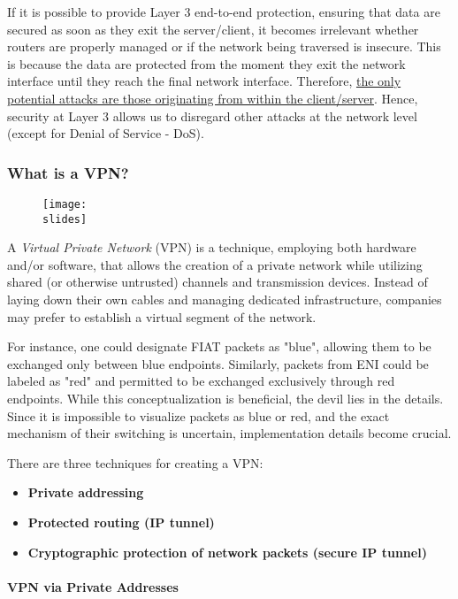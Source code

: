 If it is possible to provide Layer 3 end-to-end protection, ensuring that data are secured as soon as they exit the server/client, it becomes irrelevant whether routers are properly managed or if the network being traversed is insecure. This is because the data are protected from the moment they exit the network interface until they reach the final network interface. Therefore, \ul{the only potential attacks are those originating from within the client/server}. Hence, security at Layer 3 allows us to disregard other attacks at the network level (except for Denial of Service - DoS).


\subsubsection{What is a VPN?}

\begin{figure}[h]
    \centering
    \texttt{[image: \\slides]}
\end{figure}


A \textit{Virtual Private Network} (VPN) is a technique, employing both hardware and/or software, that allows the creation of a private network while utilizing shared (or otherwise untrusted) channels and transmission devices. Instead of laying down their own cables and managing dedicated infrastructure, companies may prefer to establish a virtual segment of the network.

For instance, one could designate FIAT packets as "blue", allowing them to be exchanged only between blue endpoints. Similarly, packets from ENI could be labeled as "red" and permitted to be exchanged exclusively through red endpoints. While this conceptualization is beneficial, the devil lies in the details. Since it is impossible to visualize packets as blue or red, and the exact mechanism of their switching is uncertain, implementation details become crucial.

There are three techniques for creating a VPN:
\begin{itemize}
    \item \textbf{Private addressing}
    \item \textbf{Protected routing (IP tunnel)}
    \item \textbf{Cryptographic protection of network packets (secure IP tunnel)}
\end{itemize}


\paragraph{VPN via Private Addresses}

